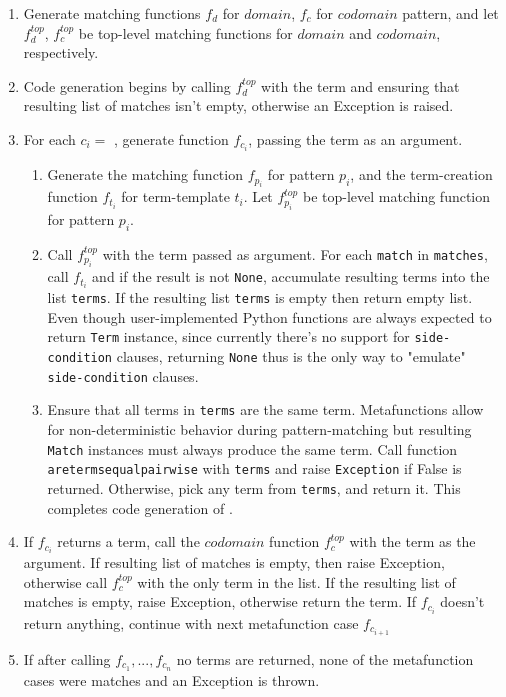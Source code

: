\begin{enumerate}
\item Generate matching functions $f_d$ for $domain$, $f_c$ for $codomain$ pattern, and let $f_d^{top}$, $f_c^{top}$ be top-level matching functions for $domain$ and $codomain$, respectively.
\item Code generation begins by calling $f_d^{top}$ with the term and ensuring that resulting list of matches isn't empty, otherwise an Exception is raised.
\item For each $c_i =$ \MetafunctionCase, generate function $f_{c_i}$, passing the term as an argument.
\begin{enumerate}
	\item Generate the matching function $f_{p_i}$ for pattern $p_i$, and the term-creation function $f_{t_i}$ for term-template $t_i$. Let $f_{p_i}^{top}$ be top-level matching function for pattern $p_i$.
	\item Call $f_{p_i}^{top}$ with the term passed as argument. For each \texttt{match} in \texttt{matches}, call $f_{t_i}$ and if the result is not \texttt{None}, accumulate resulting terms into the list \texttt{terms}. If the resulting list \texttt{terms} is empty then return empty list. Even though user-implemented Python functions are always expected to return \texttt{Term} instance, since currently there's no support for \texttt{side-condition} clauses, returning \texttt{None} thus is the only way to "emulate" \texttt{side-condition} clauses.
	\item Ensure that all terms in \texttt{terms} are the same term. Metafunctions allow for non-deterministic behavior during pattern-matching but resulting \texttt{Match} instances must always produce the same term. Call function \texttt{aretermsequalpairwise} with \texttt{terms} and raise \texttt{Exception} if False is returned. Otherwise, pick any term from \texttt{terms}, and return it.
	This completes code generation of \MetafunctionCase.
\end{enumerate}
\item If $f_{c_i}$ returns a term, call the $codomain$ function $f_c^{top}$ with the term as the argument. If resulting list of matches is empty, then raise Exception, otherwise call $f_c^{top}$ with the only term in the list. If the resulting list of matches is empty, raise Exception, otherwise return the term. If $f_{c_i}$ doesn't return anything, continue with next metafunction case $f_{c_{i+1}}$
\item If after calling $f_{c_1}, ..., f_{c_n}$ no terms are returned, none of the metafunction cases were matches and an Exception is thrown.
\end{enumerate}

